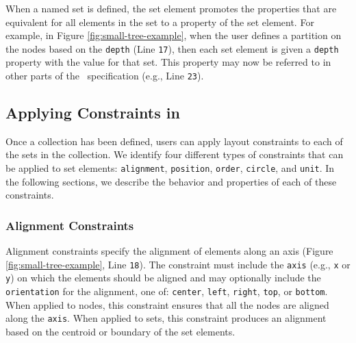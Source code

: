 
When a named set is defined, the set element promotes the properties that
are equivalent for all elements in the set to a property of the set
element. For example, in Figure \ref{fig:small-tree-example}, when the user
defines a partition on the nodes based on the \texttt{depth} (Line
\texttt{17}), then each set element is given a \texttt{depth} property with
the value for that set. This property may now be referred to in other parts
of the \projectname\ specification (e.g., Line \texttt{23}).


\subsection{Applying Constraints in \projectname}

\label{sec:constraints}
Once a collection has been defined, users can apply layout constraints to
each of the sets in the collection. We identify four different types of
constraints that can be applied to set elements: \texttt{alignment},
\texttt{position}, \texttt{order}, \texttt{circle}, and \texttt{unit}. In
the following sections, we describe the behavior and properties of each of
these constraints.


\subsubsection{Alignment Constraints}
 Alignment constraints
specify the alignment of elements along an axis (Figure
\ref{fig:small-tree-example}, Line \texttt{18}). The constraint must
include the \texttt{axis} (e.g., \texttt{x} or \texttt{y}) on which the
elements should be aligned and may optionally include the
\texttt{orientation} for the alignment, one of: \texttt{center},
\texttt{left}, \texttt{right}, \texttt{top}, or \texttt{bottom}. When
applied to nodes, this constraint ensures that all the nodes are aligned
along the \texttt{axis}. When applied to sets, this constraint produces an
alignment based on the centroid or boundary of the set elements.

